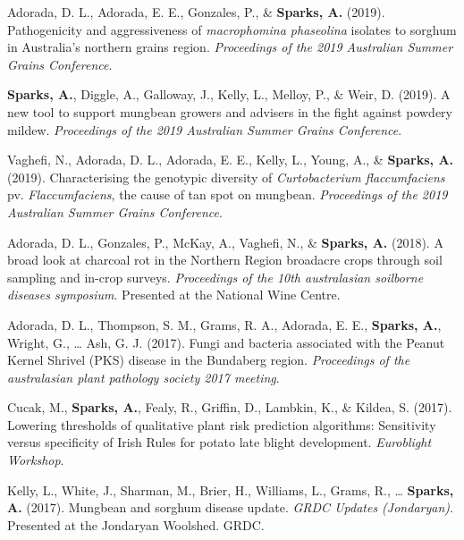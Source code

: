 \documentclass[11pt, a4paper]{awesome-cv}
\begin{document}
\begingroup
\setlength{\parindent}{-0.5in}
\setlength{\leftskip}{0.5in}

\hypertarget{refs_proceedings}{}
\leavevmode\hypertarget{ref-Adorada2019}{}%
Adorada, D. L., Adorada, E. E., Gonzales, P., \& \textbf{Sparks, A.} (2019). Pathogenicity and aggressiveness of \emph{macrophomina phaseolina} isolates to sorghum in Australia's northern grains region. \emph{Proceedings of the 2019 Australian Summer Grains Conference}.

\leavevmode\hypertarget{ref-Sparks2019ASGC}{}%
\textbf{Sparks, A.}, Diggle, A., Galloway, J., Kelly, L., Melloy, P., \& Weir, D. (2019). A new tool to support mungbean growers and advisers in the fight against powdery mildew. \emph{Proceedings of the 2019 Australian Summer Grains Conference}.

\leavevmode\hypertarget{ref-Vaghefi2019}{}%
Vaghefi, N., Adorada, D. L., Adorada, E. E., Kelly, L., Young, A., \& \textbf{Sparks, A.} (2019). Characterising the genotypic diversity of \emph{Curtobacterium flaccumfaciens} pv. \emph{Flaccumfaciens}, the cause of tan spot on mungbean. \emph{Proceedings of the 2019 Australian Summer Grains Conference}.

\leavevmode\hypertarget{ref-Adorada2018}{}%
Adorada, D. L., Gonzales, P., McKay, A., Vaghefi, N., \& \textbf{Sparks, A.} (2018). A broad look at charcoal rot in the Northern Region broadacre crops through soil sampling and in-crop surveys. \emph{Proceedings of the 10th australasian soilborne diseases symposium}. Presented at the National Wine Centre.

\leavevmode\hypertarget{ref-Adorada2017}{}%
Adorada, D. L., Thompson, S. M., Grams, R. A., Adorada, E. E., \textbf{Sparks, A.}, Wright, G., \ldots{} Ash, G. J. (2017). Fungi and bacteria associated with the Peanut Kernel Shrivel (PKS) disease in the Bundaberg region. \emph{Proceedings of the australasian plant pathology society 2017 meeting}.

\leavevmode\hypertarget{ref-Cucak2017}{}%
Cucak, M., \textbf{Sparks, A.}, Fealy, R., Griffin, D., Lambkin, K., \& Kildea, S. (2017). Lowering thresholds of qualitative plant risk prediction algorithms: Sensitivity versus specificity of Irish Rules for potato late blight development. \emph{Euroblight Workshop}.

\leavevmode\hypertarget{ref-Kelly2017}{}%
Kelly, L., White, J., Sharman, M., Brier, H., Williams, L., Grams, R., \ldots{} \textbf{Sparks, A.} (2017). Mungbean and sorghum disease update. \emph{GRDC Updates (Jondaryan)}. Presented at the Jondaryan Woolshed. GRDC.
\end{document}
